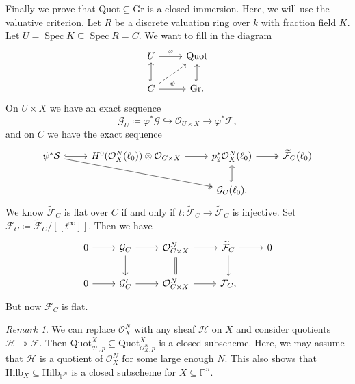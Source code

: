 \documentclass[leqno, openany]{memoir}
\theoremstyle{definition}
\theoremstyle{remark}
\newtheorem{rmk}[thm]{Remark}
\theoremstyle{plain}
\theoremstyle{definition}
\theoremstyle{remark}
\renewcommand{\P}{\mathbb{P}}
\newcommand{\mc}[1]{\mathcal{#1}}
\newcommand{\mr}[1]{\mathrm{#1}}
\newcommand{\wt}[1]{\widetilde{#1}}
\DeclareMathOperator{\Spec}{Spec}
\begin{document}
Finally we prove that $\mr{Quot} \subseteq \mr{Gr}$ is a closed immersion. Here, we will use the valuative criterion. Let $R$ be a discrete valuation ring over $k$ with fraction field $K$. Let $U = \Spec K \subseteq \Spec R = C$. We want to fill in the diagram
\begin{equation*}
\begin{tikzcd}
    U \ar{r}{\varphi} & \mr{Quot} \\
    C \ar[hookrightarrow]{u} \ar{r}{\psi} \ar[dashrightarrow]{ur} & \mr{Gr} \ar[hookrightarrow]{u}.
\end{tikzcd}
\end{equation*}
On $U \times X$ we have an exact sequence
\[ \mc{G}_U \coloneqq \varphi^* \mc{G} \hookrightarrow \mc{O}_{U \times X} \to \varphi^* \mc{F}, \]
and on $C$ we have the exact sequence
\begin{equation*}
\begin{tikzcd}
    \psi^* \mc{S} \ar[hookrightarrow]{r} \ar[twoheadrightarrow]{drr} & H^0(\mc{O}_X^N(\ell_0)) \otimes \mc{O}_{C \times X} \ar{r} & p_2^* \mc{O}_X^N(\ell_0) \ar[twoheadrightarrow]{r} & \wt{\mc{F}}_C(\ell_0) \\
    & & \mc{G}_C(\ell_0) \ar[hookrightarrow]{u}.
\end{tikzcd}
\end{equation*}
We know $\wt{\mc{F}}_C$ is flat over $C$ if and only if $t \colon \wt{\mc{F}}_C \to \wt{\mc{F}}_C$ is injective. Set $\mc{F}_C \coloneqq \wt{\mc{F}}_C / [[t^{\infty}]]$. Then we have 
\begin{equation*}
\begin{tikzcd}
    0 \ar{r} & \mc{G}_C \ar{r} \ar{d} & \mc{O}_{C \times X}^N \ar{r} \ar[equals]{d} & \wt{\mc{F}}_C \ar{d} \ar{r} & 0 \\
    0 \ar{r} & \mc{G}_C' \ar{r} & \mc{O}_{C \times X}^N \ar{r} & \mc{F}_C,
\end{tikzcd}
\end{equation*}
But now $\mc{F}_C$ is flat.

\begin{rmk}
    We can replace $\mc{O}_X^N$ with any sheaf $\mc{H}$ on $X$ and consider quotients $\mc{H} \twoheadrightarrow \mc{F}$. Then $\mr{Quot}_{\mc{H}, p}^X \subseteq \mr{Quot}_{\mc{O}_X^N, p}^X$ is a closed subscheme. Here, we may assume that $\mc{H}$ is a quotient of $\mc{O}_X^N$ for some large enough $N$. This also shows that $\mr{Hilb}_X \subseteq \mr{Hilb}_{\P^n}$ is a closed subscheme for $X \subseteq \P^n$.
\end{rmk}
\end{document}
